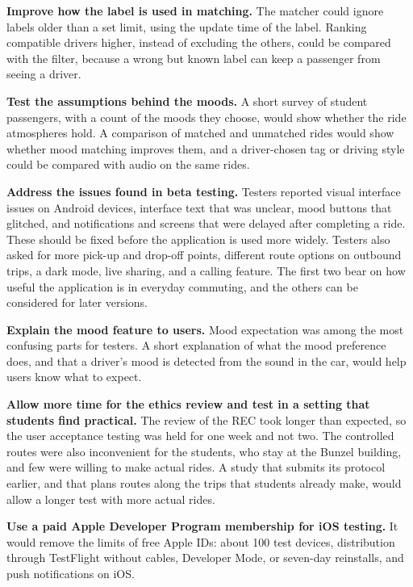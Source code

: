 \textbf{Improve how the label is used in matching.} The matcher could ignore labels older than a set limit, using the update time of the label. Ranking compatible drivers higher, instead of excluding the others, could be compared with the filter, because a wrong but known label can keep a passenger from seeing a driver.

\textbf{Test the assumptions behind the moods.} A short survey of student passengers, with a count of the moods they choose, would show whether the ride atmospheres hold. A comparison of matched and unmatched rides would show whether mood matching improves them, and a driver-chosen tag or driving style could be compared with audio on the same rides.

\textbf{Address the issues found in beta testing.} Testers reported visual interface issues on Android devices, interface text that was unclear, mood buttons that glitched, and notifications and screens that were delayed after completing a ride. These should be fixed before the application is used more widely. Testers also asked for more pick-up and drop-off points, different route options on outbound trips, a dark mode, live sharing, and a calling feature. The first two bear on how useful the application is in everyday commuting, and the others can be considered for later versions.

\textbf{Explain the mood feature to users.} Mood expectation was among the most confusing parts for testers. A short explanation of what the mood preference does, and that a driver's mood is detected from the sound in the car, would help users know what to expect.

\textbf{Allow more time for the ethics review and test in a setting that students find practical.} The review of the REC took longer than expected, so the user acceptance testing was held for one week and not two. The controlled routes were also inconvenient for the students, who stay at the Bunzel building, and few were willing to make actual rides. A study that submits its protocol earlier, and that plans routes along the trips that students already make, would allow a longer test with more actual rides.

\textbf{Use a paid Apple Developer Program membership for iOS testing.} It would remove the limits of free Apple IDs: about 100 test devices, distribution through TestFlight without cables, Developer Mode, or seven-day reinstalls, and push notifications on iOS.

